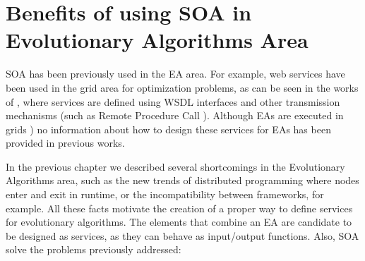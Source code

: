 \section{Benefits of using SOA in Evolutionary Algorithms Area}
\label{sec:soa:benefitsofsoa}

\lettrine{S}{OA} has been previously used in the EA area. For example,
web services have been used in the grid area for optimization
problems, as can be seen in the works of
\cite{grid1,grid2,grid3,grid5}, where services are defined using WSDL
interfaces and other transmission mechanisms (such as Remote Procedure
Call \cite{grid6,grid7}). Although EAs are executed in grids
\cite{grid8,grid4,grid10}) no information about how to design these
services for EAs has been provided in previous works.  %

In the previous chapter we described several shortcomings %
 in the Evolutionary Algorithms area, such as the new trends of
 distributed programming where nodes enter and exit in runtime, or the
 incompatibility between frameworks, for example. All these facts
 motivate the creation of a proper way to define services for evolutionary algorithms. The elements that combine an EA are candidate to be designed as services, as they can behave as input/output functions. Also, SOA solve the problems previously addressed: 



